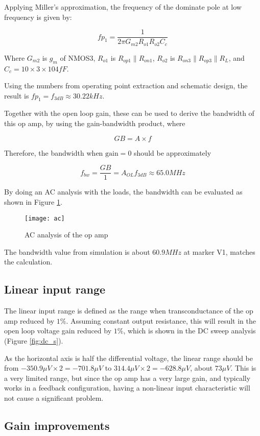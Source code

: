 Applying Miller's approximation, the frequency of the dominate pole at low frequency is given by:

$$ fp_1 = \frac{1}{2 \pi G_{m2} R_{o1} R_{o2} C_c} $$

Where $G_{m2}$ is $g_m$ of NMOS3, $R_{o1}$ is $R_{op1} \parallel R_{on1}$, $R_{o2}$ is $R_{on3} \parallel R_{op3} \parallel R_L$, and $C_c = 10 \times 3 \times 104f F$.

Using the numbers from operating point extraction and schematic design, the result is $fp_1 = f_{3dB} \approx 30.22k Hz$.

Together with the open loop gain, these can be used to derive the bandwidth of this op amp, by using the gain-bandwidth product, where

$$ GB = A \times f $$

Therefore, the bandwidth when $\text{gain} = 0$ should be approximately

$$ f_{bw} = \frac{GB}{1} = A_{OL} f_{3dB} \approx 65.0 MHz $$

By doing an AC analysis with the loads, the bandwidth can be evaluated as shown in Figure \ref{fig:ac}.

\begin{figure}[!htb]
	\centering
	\texttt{[image: ac]}
	\caption{AC analysis of the op amp}
	\label{fig:ac}
\end{figure}

The bandwidth value from simulation is about $60.9M Hz$ at marker V1, matches the calculation.

\subsection{Linear input range}

The linear input range is defined as the range when transconductance of the op amp reduced by $1\%$. Assuming constant output resistance, this will result in the open loop voltage gain reduced by $1\%$, which is shown in the DC sweep analysis (Figure \ref{fig:dc_s}).

As the horizontal axis is half the differential voltage, the linear range should be from $-350.9\mu V \times 2 = -701.8\mu V$ to $314.4\mu V \times 2 = -628.8\mu V$, about $73\mu V$. This is a very limited range, but since the op amp has a very large gain, and typically works in a feedback configuration, having a non-linear input characteristic will not cause a significant problem.

\subsection{Gain improvements}

